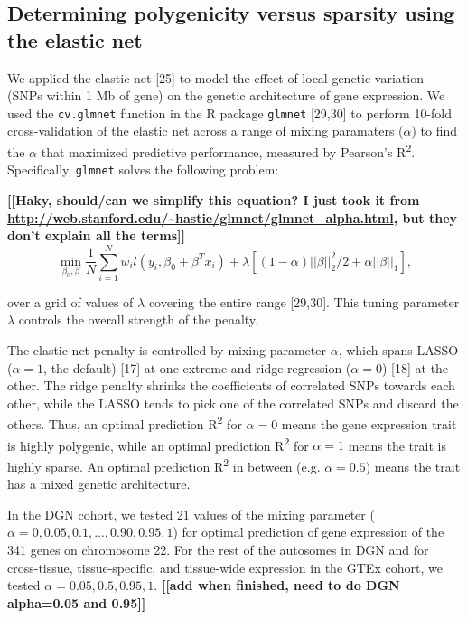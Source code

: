 \documentclass[]{article}
\begin{document}
\subsection{Determining polygenicity versus sparsity using the elastic
net}\label{determining-polygenicity-versus-sparsity-using-the-elastic-net}

We applied the elastic net {[}25{]} to model the effect of local genetic
variation (SNPs within 1 Mb of gene) on the genetic architecture of gene
expression. We used the \texttt{cv.glmnet} function in the R package
\texttt{glmnet} {[}29,30{]} to perform 10-fold cross-validation of the
elastic net across a range of mixing paramaters (\(\alpha\)) to find the
\(\alpha\) that maximized predictive performance, measured by Pearson's
R\textsuperscript{2}. Specifically, \texttt{glmnet} solves the following
problem:

\textbf{{[}{[}Haky, should/can we simplify this equation? I just took it
from \url{http://web.stanford.edu/~hastie/glmnet/glmnet_alpha.html}, but
they don't explain all the terms{]}{]}}
{\[\min_{\beta_0,\beta} \frac{1}{N} \sum_{i=1}^{N} w_i l(y_i,\beta_0+\beta^T x_i) + \lambda\left[(1-\alpha)||\beta||_2^2/2 + \alpha ||\beta||_1\right], \]}

over a grid of values of \(\lambda\) covering the entire range
{[}29,30{]}. This tuning parameter \(\lambda\) controls the overall
strength of the penalty.

The elastic net penalty is controlled by mixing parameter \(\alpha\),
which spans LASSO (\(\alpha=1\), the default) {[}17{]} at one extreme
and ridge regression (\(\alpha=0\)) {[}18{]} at the other. The ridge
penalty shrinks the coefficients of correlated SNPs towards each other,
while the LASSO tends to pick one of the correlated SNPs and discard the
others. Thus, an optimal prediction R\textsuperscript{2} for
\(\alpha=0\) means the gene expression trait is highly polygenic, while
an optimal prediction R\textsuperscript{2} for \(\alpha=1\) means the
trait is highly sparse. An optimal prediction R\textsuperscript{2} in
between (e.g. \(\alpha=0.5\)) means the trait has a mixed genetic
architecture.

In the DGN cohort, we tested 21 values of the mixing parameter
(\(\alpha=0, 0.05, 0.1, ..., 0.90, 0.95, 1\)) for optimal prediction of
gene expression of the 341 genes on chromosome 22. For the rest of the
autosomes in DGN and for cross-tissue, tissue-specific, and tissue-wide
expression in the GTEx cohort, we tested \(\alpha=0.05, 0.5, 0.95, 1\).
\textbf{{[}{[}add when finished, need to do DGN alpha=0.05 and
0.95{]}{]}}
\end{document}

